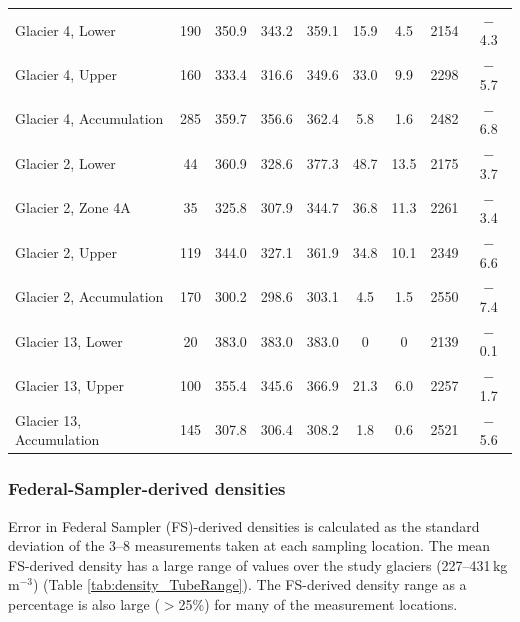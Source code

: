 \documentclass{sfuthesis}
\begin{document}
{\begin{table}
{\begin{tabular}{lcccccccc}
Glacier 4, Lower & 190 & 350.9 & 343.2 & 359.1 & 15.9 & 4.5 & 2154 & $-$ 4.3\\
Glacier 4, Upper & 160 & 333.4 & 316.6 & 349.6 & 33.0 & 9.9  & 2298 & $-$ 5.7\\
Glacier 4, Accumulation& 285 & 359.7 & 356.6 & 362.4 & 5.8 & 1.6  & 2482 & $-$ 6.8\\  \hline
Glacier 2, Lower  & 44 & 360.9 & 328.6 & 377.3 & 48.7 & 13.5 & 2175 & $-$ 3.7 \\
Glacier 2, Zone 4A & 35 & 325.8 & 307.9 & 344.7 & 36.8 & 11.3 & 2261 & $-$ 3.4 \\
Glacier 2, Upper  & 119 & 344.0 & 327.1 & 361.9 & 34.8 & 10.1 & 2349 & $-$ 6.6 \\ 
Glacier 2, Accumulation & 170 & 300.2 & 298.6 & 303.1 & 4.5 & 1.5  & 2550 & $-$ 7.4\\  \hline
Glacier 13, Lower  & 20 & 383.0 & 383.0 & 383.0 & 0 & 0  & 2139 & $-$ 0.1\\
Glacier 13, Upper & 100 & 355.4 & 345.6 & 366.9 & 21.3 & 6.0 & 2257 & $-$ 1.7 \\
Glacier 13, Accumulation & 145 & 307.8 & 306.4 & 308.2 & 1.8 & 0.6 & 2521 & $-$ 5.6
\end{tabular}%
}
\end{table}

\subsubsection{Federal-Sampler-derived densities}

Error in Federal Sampler (FS)-derived densities is calculated as the standard deviation of the 3--8 measurements taken at each sampling location. The mean FS-derived density has a large range of values over the study glaciers (227--431\,kg\,m$^{-3}$) (Table \ref{tab:density_TubeRange}). The FS-derived density range as a percentage is also large ($>$25\%) for many of the measurement locations. 

}
\end{document}
